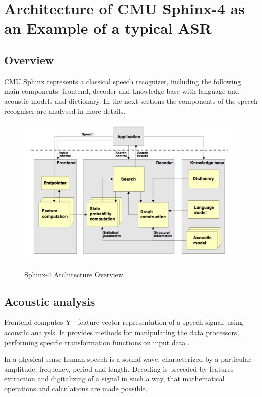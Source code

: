 \chapter{Architecture of CMU Sphinx-4 as an Example of a typical ASR}
\label{chap:sphinx}
 \section {Overview} 
CMU Sphinx represents a classical speech recognizer, including the following
main components: frontend, decoder and knowledge base with language and acoustic
models and dictionary. In the next sections the components of the speech
recogniser are analysed in more details.
 
 \begin{figure}[htbp]
  \centering
    \includegraphics[width=1.0\textwidth]{images/sphinxarch.png}
 \caption{Sphinx-4 Architecture Overview}\parencite {Lamereetal2013:Eurospeech}
  \label{fig:sphinx arh}
\end {figure}

 \section {Acoustic analysis} 

Frontend computes Y - feature vector  representation of a speech signal, using
acoustic analysis.  It provides methods for manipulating the data processors, performing
specific transformation functions on input data \parencite{Lamereetal2013:Eurospeech}.

In a physical sense human speech is a sound wave, characterized by a particular amplitude, frequency, period and length.
Decoding is preceded by features extraction and digitalizing of a signal in such a way, that mathematical operations and calculations are made possible. 

